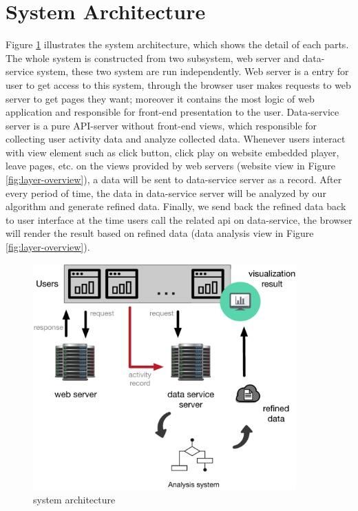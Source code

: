 \section{System Architecture}
Figure \ref{fig:sys-arch} illustrates the system architecture, which shows the detail of each parts.
The whole system is constructed from two subsystem, web server and data-service system, these two system are run independently.
Web server is a entry for user to get access to this system, through the browser user makes requests to web server to get pages they want;
moreover it contains the most logic of web application and responsible for front-end presentation to the user.
Data-service server is a pure API-server without front-end views, which responsible for collecting user activity data and analyze collected data.
Whenever users interact with view element such as click button, click play on website embedded player, leave pages, etc. on the views provided by web servers (website view in Figure \ref{fig:layer-overview}),
a data will be sent to data-service server as a record.
After every period of time, the data in data-service server will be analyzed by our algorithm and generate refined data.
Finally, we send back the refined data back to user interface at the time users call the related api on data-service, the browser will render the result based on refined data (data analysis view in Figure \ref{fig:layer-overview}).

\begin{figure}[H]
    \centering
    \includegraphics[width = 0.9\textwidth]{fig/system-architecture-outline.eps}
    \caption{system architecture}
    \label{fig:sys-arch}
\end{figure}

